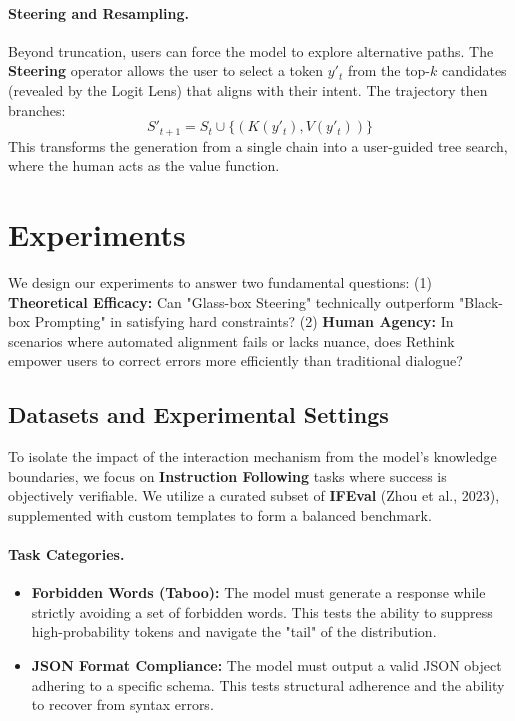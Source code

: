 \documentclass{article}
\begin{document}
\paragraph{Steering and Resampling.}
Beyond truncation, users can force the model to explore alternative paths. The \textbf{Steering} operator allows the user to select a token $y'_t$ from the top-$k$ candidates (revealed by the Logit Lens) that aligns with their intent. The trajectory then branches:
\begin{equation}
    S'_{t+1} = S_t \cup \{(K(y'_t), V(y'_t))\}
\end{equation}
This transforms the generation from a single chain into a user-guided tree search, where the human acts as the value function.

\section{Experiments}

We design our experiments to answer two fundamental questions: (1) \textbf{Theoretical Efficacy:} Can "Glass-box Steering" technically outperform "Black-box Prompting" in satisfying hard constraints? (2) \textbf{Human Agency:} In scenarios where automated alignment fails or lacks nuance, does Rethink empower users to correct errors more efficiently than traditional dialogue?

\subsection{Datasets and Experimental Settings}
To isolate the impact of the interaction mechanism from the model's knowledge boundaries, we focus on \textbf{Instruction Following} tasks where success is objectively verifiable. We utilize a curated subset of \textbf{IFEval} (Zhou et al., 2023), supplemented with custom templates to form a balanced benchmark.

\paragraph{Task Categories.}
\begin{itemize}
    \item \textbf{Forbidden Words (Taboo):} The model must generate a response while strictly avoiding a set of forbidden words. This tests the ability to suppress high-probability tokens and navigate the "tail" of the distribution.
    \item \textbf{JSON Format Compliance:} The model must output a valid JSON object adhering to a specific schema. This tests structural adherence and the ability to recover from syntax errors.
\end{itemize}
\end{document}
